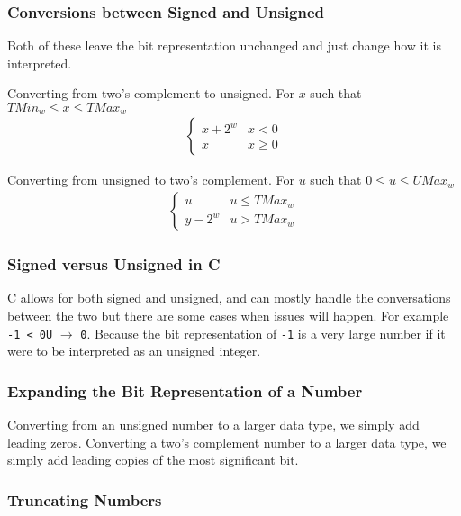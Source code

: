 \documentclass[10pt]{armath}
\newcommand{\s}[1]{\texttt{#1}}
\begin{document}
\subsubsection{Conversions between Signed and Unsigned}%
\label{ssub:conversions_between_signed_and_unsigned}

Both of these leave the bit representation unchanged and just change how it is
interpreted.

Converting from two's complement to unsigned. For $x$ such that $TMin_w\leq
x\leq TMax_w$
\begin{align*}
  \begin{cases}
    x+2^w & x<0\\
    x & x\geq 0
  \end{cases}
\end{align*}

Converting from unsigned to two's complement. For $u$ such that $0\leq u\leq
UMax_w$
\begin{align*}
  \begin{cases}
    u & u \leq TMax_w\\
    y-2^w & u > TMax_w
  \end{cases}
\end{align*}

\subsubsection{Signed versus Unsigned in C}%
\label{ssub:signed_versus_unsigned_in_c}

C allows for both signed and unsigned, and can mostly handle the conversations
between the two but there are some cases when issues will happen. For example
\s{-1 < 0U} $\rightarrow$ \s{0}. Because the bit representation of \s{-1} is a
very large number if it were to be interpreted as an unsigned integer.

\subsubsection{Expanding the Bit Representation of a Number}%
\label{ssub:expanding_the_bit_representation_of_a_number}

Converting from an unsigned number to a larger data type, we simply add leading
zeros. Converting a two's complement number to a larger data type, we simply
add leading copies of the most significant bit.

\subsubsection{Truncating Numbers}%
\label{ssub:truncating_numbers}
\end{document}
